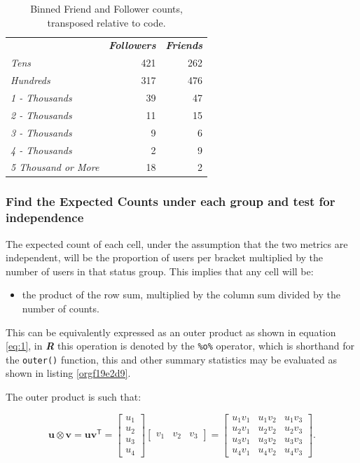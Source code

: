 \documentclass[11pt]{article}
\begin{document}
\begin{table}[htbp]
\caption{\label{tab:org87a5261}Binned Friend and Follower counts, transposed relative to code.}
\centering
\begin{tabular}{lrr}
 & \textbf{\textbf{\emph{Followers}}} & \textbf{\textbf{\emph{Friends}}}\\
\emph{Tens} & 421 & 262\\
\emph{Hundreds} & 317 & 476\\
\emph{1 - Thousands} & 39 & 47\\
\emph{2 - Thousands} & 11 & 15\\
\emph{3 - Thousands} & 9 & 6\\
\emph{4 - Thousands} & 2 & 9\\
\emph{5 Thousand or More} & 18 & 2\\
\end{tabular}
\end{table}

\subsubsection{Find the Expected Counts under each group and test for independence}
\label{sec:org7a983c9}
The expected count of each cell, under the assumption that the two metrics are
independent, will be the proportion of users per bracket multiplied by the number
of users in that status group. This implies that any cell will be:

\begin{itemize}
\item the product of the row sum, multiplied by the column sum divided by the number of counts.
\end{itemize}

This can be equivalently expressed as an outer product as shown in equation
\eqref{eq:1}, in \textbf{\emph{R}} this operation is denoted by the \texttt{\%o\%} operator, which is
shorthand for the \texttt{outer()} function, this and other summary statistics may be
evaluated as shown in listing \ref{orgf19e2d9}.

The outer product is such that:


$$
\mathbf{u} \otimes \mathbf {v} =\mathbf {u} \mathbf {v} ^{\textsf {T}}={\begin{bmatrix}u_{1}\\u_{2}\\u_{3}\\u_{4}\end{bmatrix}}{\begin{bmatrix}v_{1}&v_{2}&v_{3}\end{bmatrix}}={\begin{bmatrix}u_{1}v_{1}&u_{1}v_{2}&u_{1}v_{3}\\u_{2}v_{1}&u_{2}v_{2}&u_{2}v_{3}\\u_{3}v_{1}&u_{3}v_{2}&u_{3}v_{3}\\u_{4}v_{1}&u_{4}v_{2}&u_{4}v_{3}\end{bmatrix}}.
$$
\end{document}
